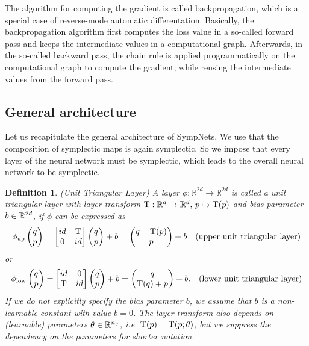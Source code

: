 \documentclass[twoside,a4paper]{article}
\newtheorem{definition}{Definition}
\begin{document}
The algorithm for computing the gradient is called backpropagation, which
is a special case of reverse-mode automatic differentation.
Basically, the backpropagation algorithm first computes the loss value 
in a so-called forward pass
and keeps the intermediate values in a computational graph.
Afterwards, in the so-called backward pass, the chain rule is applied programmatically
on the computational graph to compute the gradient, while reusing the intermediate values
from the forward pass.

\subsection{General architecture}

Let us recapitulate the general architecture of SympNets.
We use that the composition of symplectic maps is again symplectic. So we impose that every
layer of the neural network must be symplectic, which leads to the overall neural network
to be symplectic.

\begin{definition}
	(Unit Triangular Layer) A layer $\phi : \mathbb{R}^{2d} \to \mathbb{R}^{2d}$ 
	is called a unit triangular layer with layer transform 
	$\mathrm{T} : \mathbb{R}^d \to \mathbb{R}^d,\, p \mapsto \mathrm{T}(p)$
	and bias parameter $b \in \mathbb{R}^{2d}$, if $\phi$ can be expressed as
	\begin{equation*}
		\phi_{\text{up}} \begin{pmatrix} q \\ p \end{pmatrix} = \begin{bmatrix} id & {\mathrm{T}} \\ 0 & id \end{bmatrix} \begin{pmatrix} q \\ p \end{pmatrix} + b
		= \begin{pmatrix}
			q + \mathrm{T}(p) \\
			p
		\end{pmatrix} + b \quad \text{(upper unit triangular layer)}
	\end{equation*}
	or
	\begin{equation*}
		\phi_{\text{low}} \begin{pmatrix} q \\ p \end{pmatrix} = \begin{bmatrix} id & 0 \\ {\mathrm{T}} & id \end{bmatrix} \begin{pmatrix} q \\ p \end{pmatrix} + b
		= \begin{pmatrix}
			q \\
			\mathrm{T}(q) + p
		\end{pmatrix} + b. \quad \text{(lower unit triangular layer)}
	\end{equation*}
	If we do not explicitly specify the bias parameter $b$, we assume
	that $b$ is a non-learnable constant with value $b=0$. The layer transform
	also depends on (learnable) parameters $\theta \in \mathbb{R}^{n_\theta}$, i.e.
	$\mathrm{T}(p) = \mathrm{T}(p;\theta)$, 
	but we suppress the dependency on the parameters for shorter notation.
\end{definition}
\end{document}
